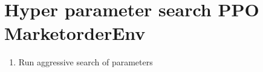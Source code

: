 \documentclass[11pt]{article}
\author{olle}
\date{\today}
\title{}
\begin{document}
\tableofcontents

\section{Hyper parameter search PPO MarketorderEnv}
\label{sec:org3622314}

\begin{enumerate}
\item Run aggressive search of parameters
\end{enumerate}
\end{document}
